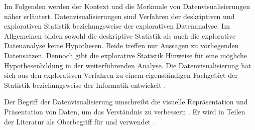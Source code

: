 Im Folgenden werden der Kontext und die Merkmale von Datenvisualisierungen näher erläutert.
%
Datenvisualisierungen sind Verfahren der deskriptiven und explorativen Statistik beziehungsweise der explorativen Datenanalyse. 
Im Allgemeinen bilden sowohl die deskriptive Statistik als auch die explorative Datenanalyse keine Hypothesen. Beide treffen nur Aussagen zu vorliegenden Datensätzen. 
Dennoch gibt die explorative Statistik Hinweise für eine mögliche Hypothesenbildung in der weiterführenden Analyse. 
Die Datenvisualisierung hat sich aus den explorativen Verfahren zu einem eigenständigen Fachgebiet der Statistik 
beziehungsweise der Informatik entwickelt \cite[vgl.][28 f.]{becker_stochastische_2016}. 


Der Begriff der Datenvisualisierung umschreibt die visuelle Repräsentation und Präsentation von Daten, um das Verständnis zu verbessern \cite[vgl.][15 ff.]{kirk_data_2019}.
Er wird in Teilen der Literatur als Oberbegriff für  und 
 verwendet \cite[vgl.][11]{few_now_2009}.

